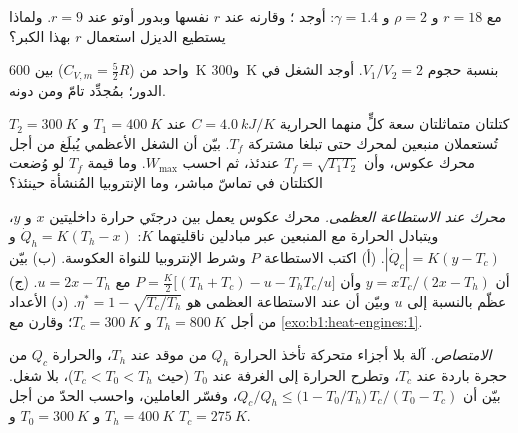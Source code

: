 \begin{exercise}[$\star\star$]\label{exo:b1:heat-engines:7}
 مع $r = 18$ و $\rho = 2$ و $\gamma = 1.4$: أوجد ؛
وقارنه  عند $r$ نفسها وبدور أوتو عند
$r = 9$. ولماذا يستطيع الديزل استعمال $r$ بهذا الكبر؟
\end{exercise}

\begin{exercise}[$\star\star$]\label{exo:b1:heat-engines:8}
  واحد من  ($C_{V,m} = \tfrac52R$) بين
\qty{600}{K} و\qty{300}{K} بنسبة حجوم $V_1/V_2 = 2$. أوجد الشغل في
الدور؛  بمُجدِّد تامّ ومن دونه.
\end{exercise}

\begin{exercise}[$\star\star$]\label{exo:b1:heat-engines:9}
كتلتان متماثلتان سعة كلٍّ منهما الحرارية $C = \qty{4.0}{kJ/K}$ عند $T_1 =
\qty{400}{K}$ و $T_2 = \qty{300}{K}$ تُستعملان منبعين لمحرك
حتى تبلغا  مشتركة $T_f$. بيّن أن الشغل الأعظمي
يُبلَغ من أجل محرك عكوس، وأن $T_f = \sqrt{T_1T_2}$ عندئذ، ثم
احسب $W_{\max}$. وما قيمة $T_f$ لو وُضعت الكتلتان في تماسّ
مباشر، وما الإنتروبيا المُنشأة حينئذ؟
\end{exercise}

\begin{exercise}[$\star\star\star$]\label{exo:b1:heat-engines:10}
\emph{محرك عند الاستطاعة العظمى.} محرك عكوس يعمل بين
درجتَي حرارة داخليتين $x$ و $y$، ويتبادل الحرارة مع المنبعين
عبر مبادلين ناقليتهما $K$: $\dot Q_h = K(T_h - x)$ و
$|\dot Q_c| = K(y - T_c)$. (أ) اكتب الاستطاعة $P$ وشرط
الإنتروبيا للنواة العكوسة. (ب) بيّن أن $y = xT_c/(2x - T_h)$ وأن
$P = \frac{K}{2}\bigl[(T_h + T_c) - u - T_hT_c/u\bigr]$ مع $u = 2x - T_h$.
(ج) عظّم بالنسبة إلى $u$ وبيّن أن  عند الاستطاعة العظمى هو
$\eta^\ast = 1 - \sqrt{T_c/T_h}$. (د) الأعداد من أجل $T_h = \qty{800}{K}$
و $T_c = \qty{300}{K}$؛ وقارن مع \cref{exo:b1:heat-engines:1}.
\end{exercise}

\begin{exercise}[$\star\star\star$]\label{exo:b1:heat-engines:11}
\emph{ الامتصاص.} آلة بلا أجزاء متحركة تأخذ
الحرارة $Q_h$ من موقد عند $T_h$، والحرارة $Q_c$ من حجرة
باردة عند $T_c$، وتطرح الحرارة إلى الغرفة عند $T_0$ (حيث $T_c < T_0 <
T_h$)، بلا شغل. بيّن أن
$Q_c/Q_h \leq \bigl(1 - T_0/T_h\bigr)\,T_c/(T_0 - T_c)$، وفسّر
العاملين، واحسب الحدّ من أجل $T_h = \qty{400}{K}$ و $T_0 =
\qty{300}{K}$ و $T_c = \qty{275}{K}$.
\end{exercise}

